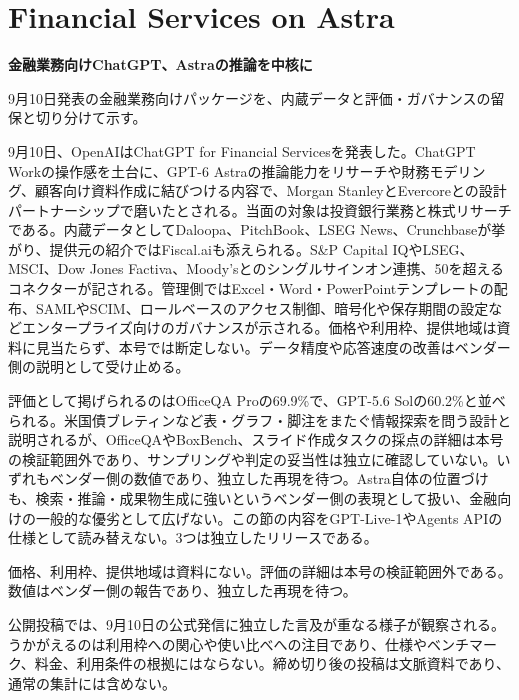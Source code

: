 \section{Financial Services on Astra}
\begin{wideflow}
{\Large\bfseries 金融業務向けChatGPT、Astraの推論を中核に}\par
\smallskip
{\color{SurveyMuted}9月10日発表の金融業務向けパッケージを、内蔵データと評価・ガバナンスの留保と切り分けて示す。}\par
\end{wideflow}

9月10日、OpenAIはChatGPT for Financial Servicesを発表した\cite{finserv}。ChatGPT Workの操作感を土台に、GPT-6 Astraの推論能力をリサーチや財務モデリング、顧客向け資料作成に結びつける内容で、Morgan StanleyとEvercoreとの設計パートナーシップで磨いたとされる。当面の対象は投資銀行業務と株式リサーチである。内蔵データとしてDaloopa、PitchBook、LSEG News、Crunchbaseが挙がり、提供元の紹介ではFiscal.aiも添えられる。S\&P Capital IQやLSEG、MSCI、Dow Jones Factiva、Moody'sとのシングルサインオン連携、50を超えるコネクターが記される。管理側ではExcel・Word・PowerPointテンプレートの配布、SAMLやSCIM、ロールベースのアクセス制御、暗号化や保存期間の設定などエンタープライズ向けのガバナンスが示される。価格や利用枠、提供地域は資料に見当たらず、本号では断定しない。データ精度や応答速度の改善はベンダー側の説明として受け止める。

評価として掲げられるのはOfficeQA Proの69.9\%で、GPT-5.6 Solの60.2\%と並べられる\cite{finserv}。米国債ブレティンなど表・グラフ・脚注をまたぐ情報探索を問う設計と説明されるが、OfficeQAやBoxBench、スライド作成タスクの採点の詳細は本号の検証範囲外であり、サンプリングや判定の妥当性は独立に確認していない。いずれもベンダー側の数値であり、独立した再現を待つ。Astra自体の位置づけも、検索・推論・成果物生成に強いというベンダー側の表現として扱い、金融向けの一般的な優劣として広げない。この節の内容をGPT-Live-1やAgents APIの仕様として読み替えない。3つは独立したリリースである。

\begin{claimboundary}[資料と評価の境界]
価格、利用枠、提供地域は資料にない。評価の詳細は本号の検証範囲外である。数値はベンダー側の報告であり、独立した再現を待つ。
\end{claimboundary}

\begin{communitynote}
公開投稿では、9月10日の公式発信に独立した言及が重なる様子が観察される\cite{w37x-astra-official,w37x-astra-ind}。うかがえるのは利用枠への関心や使い比べへの注目であり、仕様やベンチマーク、料金、利用条件の根拠にはならない。締め切り後の投稿は文脈資料であり、通常の集計には含めない。
\end{communitynote}
